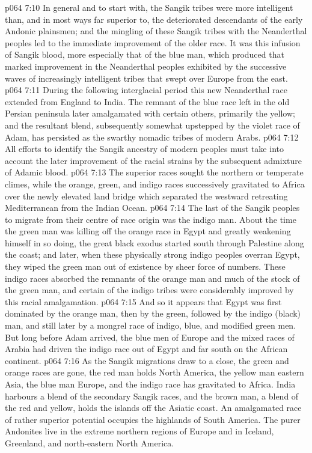\vs p064 7:10 In general and to start with, the Sangik tribes were more intelligent than, and in most ways far superior to, the deteriorated descendants of the early Andonic plainsmen; and the mingling of these Sangik tribes with the Neanderthal peoples led to the immediate improvement of the older race. It was this infusion of Sangik blood, more especially that of the blue man, which produced that marked improvement in the Neanderthal peoples exhibited by the successive waves of increasingly intelligent tribes that swept over Europe from the east.
\vs p064 7:11 During the following interglacial period this new Neanderthal race extended from England to India. The remnant of the blue race left in the old Persian peninsula later amalgamated with certain others, primarily the yellow; and the resultant blend, subsequently somewhat upstepped by the violet race of Adam, has persisted as the swarthy nomadic tribes of modern Arabs.
\vs p064 7:12 \pc All efforts to identify the Sangik ancestry of modern peoples must take into account the later improvement of the racial strains by the subsequent admixture of Adamic blood.
\vs p064 7:13 \pc The superior races sought the northern or temperate climes, while the orange, green, and indigo races successively gravitated to Africa over the newly elevated land bridge which separated the westward retreating Mediterranean from the Indian Ocean.
\vs p064 7:14 The last of the Sangik peoples to migrate from their centre of race origin was the indigo man. About the time the green man was killing off the orange race in Egypt and greatly weakening himself in so doing, the great black exodus started south through Palestine along the coast; and later, when these physically strong indigo peoples overran Egypt, they wiped the green man out of existence by sheer force of numbers. These indigo races absorbed the remnants of the orange man and much of the stock of the green man, and certain of the indigo tribes were considerably improved by this racial amalgamation.
\vs p064 7:15 And so it appears that Egypt was first dominated by the orange man, then by the green, followed by the indigo (black) man, and still later by a mongrel race of indigo, blue, and modified green men. But long before Adam arrived, the blue men of Europe and the mixed races of Arabia had driven the indigo race out of Egypt and far south on the African continent.
\vs p064 7:16 As the Sangik migrations draw to a close, the green and orange races are gone, the red man holds North America, the yellow man eastern Asia, the blue man Europe, and the indigo race has gravitated to Africa. India harbours a blend of the secondary Sangik races, and the brown man, a blend of the red and yellow, holds the islands off the Asiatic coast. An amalgamated race of rather superior potential occupies the highlands of South America. The purer Andonites live in the extreme northern regions of Europe and in Iceland, Greenland, and north\hyp{}eastern North America.
